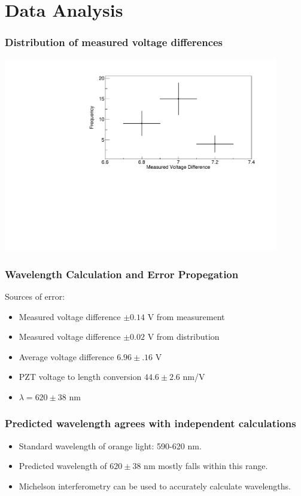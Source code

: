 \documentclass{beamer}
\begin{document}
\section{Data Analysis}

\begin{frame}
  \frametitle{Distribution of measured voltage differences}
  \includegraphics[width=12cm]{graph_helvetica}
\end{frame}

\begin{frame}
  \frametitle{Wavelength Calculation and Error Propegation}
  Sources of error:
  \begin{itemize}
    \item Measured voltage difference $\pm 0.14$ V from measurement
      \pause
    \item Measured voltage difference $\pm 0.02$ V from distribution
      \pause
    \item Average voltage difference $6.96 \pm .16$ V
      \pause
    \item PZT voltage to length conversion $44.6 \pm 2.6$ nm/V
      \pause
    \item $\lambda = 620 \pm 38$ nm
  \end{itemize}
\end{frame}

\begin{frame}
  \frametitle{Predicted wavelength agrees with independent calculations}
  \begin{itemize}
    \item
    Standard wavelength of orange light: 590-620 nm.
  \item Predicted wavelength of $620 \pm 38$ nm mostly falls within this range.
  \item Michelson interferometry can be used to accurately calculate wavelengths.
\end{itemize}
\end{frame}
\end{document}
